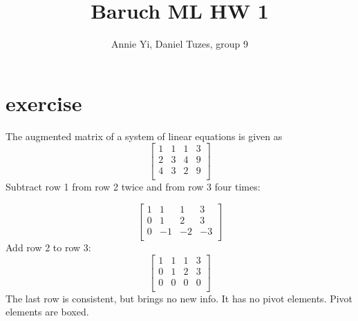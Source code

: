\documentclass{article}
\title{Baruch ML HW 1}
\author{Annie Yi, Daniel Tuzes, group 9}
\begin{document}
\maketitle
\section{exercise}
The augmented matrix of a system of linear equations is given as
\[
    \left[
        \begin{array}{ccc|c}
            1 & 1 & 1 & 3 \\
            2 & 3 & 4 & 9 \\
            4 & 3 & 2 & 9 \\
        \end{array}
        \right]
\]
Subtract row 1 from row 2 twice and from row 3 four times:

\[
    \left[
        \begin{array}{ccc|c}
            1 & 1  & 1  & 3  \\         %
            0 & 1  & 2  & 3  \\         %
            0 & -1 & -2 & -3 \\      %
        \end{array}
        \right]
\]
Add row 2 to row 3:
\[
    \left[
        \begin{array}{ccc|c}
            \boxed{1} & 1         & 1 & 3 \\      %
            0         & \boxed{1} & 2 & 3 \\      %
            0         & 0         & 0 & 0 \\      %
        \end{array}
        \right]
\]
The last row is consistent, but brings no new info.
It has no pivot elements. Pivot elements are boxed.
\end{document}
